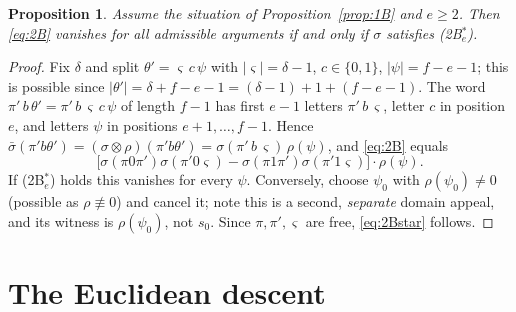 \documentclass[11pt]{article}
\newtheorem{proposition}[theorem]{Proposition}
\theoremstyle{definition}
\theoremstyle{remark}
\begin{document}
\begin{proposition}\label{prop:2B}
Assume the situation of Proposition~\ref{prop:1B} and $e\ge2$.  Then \eqref{eq:2B} vanishes
for all admissible arguments if and only if $\sigma$ satisfies \textnormal{(2B$^*_e$)}.
\end{proposition}

\begin{proof}
Fix $\delta$ and split $\theta'=\varsigma\,c\,\psi$ with $|\varsigma|=\delta-1$,
$c\in\{0,1\}$, $|\psi|=f-e-1$; this is possible since
$|\theta'|=\delta+f-e-1=(\delta-1)+1+(f-e-1)$.  The word $\pi'\,b\,\theta'
=\pi'\,b\,\varsigma\,c\,\psi$ of length $f-1$ has first $e-1$ letters $\pi'\,b\,\varsigma$,
letter $c$ in position $e$, and letters $\psi$ in positions $e+1,\dots,f-1$.  Hence
$\bar\sigma(\pi'b\theta')=(\sigma\otimes\rho)(\pi'b\theta')
=\sigma(\pi'\,b\,\varsigma)\,\rho(\psi)$, and \eqref{eq:2B} equals
\[
   \bigl[\sigma(\pi0\pi')\sigma(\pi'0\varsigma)-\sigma(\pi1\pi')\sigma(\pi'1\varsigma)\bigr]
   \cdot\rho(\psi).
\]
If (2B$^*_e$) holds this vanishes for every $\psi$.  Conversely, choose $\psi_0$ with
$\rho(\psi_0)\ne0$ (possible as $\rho\not\equiv0$) and cancel it; note this is a second,
\emph{separate} domain appeal, and its witness is $\rho(\psi_0)$, not $s_0$.  Since
$\pi,\pi',\varsigma$ are free, \eqref{eq:2Bstar} follows.
\end{proof}

\section{The Euclidean descent}\label{sec:euclid}
\end{document}
